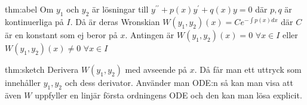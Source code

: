 \begin{theo}{thm:abel}
  Om $y_1$ och $y_2$ är lösningar till $y^{\prime\prime}+p(x)y^{\prime}+q(x)y=0$ där $p,q$ är kontinuerliga på $I$. Då är deras Wronskian $W(y_1, y_2)(x)=Ce^{-\int p(x)dx}$ där $C$ är en konstant som ej beror på $x$. Antingen är $W(y_1, y_2)(x)=0$ $\forall x\in I$ eller $W(y_1, y_2)(x)\neq0 $ $\forall x\in I$
\end{theo}
\par\bigskip

\begin{prf}{thm:sketch}
  Derivera $W(y_1, y_2)$ med avseende på $x$. Då får man ett uttryck som innehåller $y_1, y_2$ och dess derivator. Använder man ODE:n så kan man visa att även $W$ uppfyller en linjär första ordningens ODE och den kan man lösa explicit.
\end{prf}





















